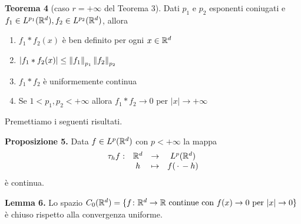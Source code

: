 \textbf{Teorema 4} (caso $r = +\infty$ del Teorema 3).
Dati $p_1$ e $p_2$ esponenti coniugati e $f_1 \in L^{p_1}(\mathbb R^d), f_2 \in L^{p_2}(\mathbb R^d)$, allora
\begin{enumerate}
	\item \label{item:20ott_th4_1} 
		$f_1 \ast f_2(x)$ è ben definito per ogni $x \in \mathbb R^d$

	\item \label{item:20ott_th4_2}
		$|f_1 \ast f_2(x)| \leq \left\lVert f_1 \right\rVert_{p_1} \left\lVert f_2 \right\rVert_{p_2}$

	\item \label{item:20ott_th4_3} 
		$f_1 \ast f_2$ è uniformemente continua

	\item \label{item:20ott_th4_4}
		Se $1 < p_1, p_2 < +\infty$ allora $f_1 \ast f_2 \to 0$ per $|x| \to +\infty$
\end{enumerate}

Premettiamo i seguenti risultati.

\textbf{Proposizione 5.}
Data $f \in L^p(\mathbb R^d)$ con $p < +\infty$ la mappa
$$
\begin{array}{cccc}
	\tau_h f : & \mathbb R^d & \to & L^p(\mathbb R^d) \\
	& h & \mapsto & f(\,\cdot\, - h)
\end{array}
$$
è continua.

\textbf{Lemma 6.}
Lo spazio $C_0(\mathbb R^d) = \{ f \colon \mathbb R^d \to \mathbb R \text{ continue con } f(x) \to 0 \text{ per } |x| \to 0 \}$ è chiuso rispetto alla convergenza uniforme.


